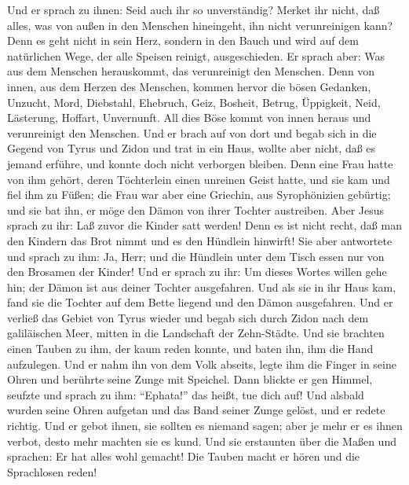  Und er sprach zu ihnen: Seid auch ihr so unverständig?
Merket ihr nicht, daß alles, was von außen in den Menschen hineingeht,
ihn nicht verunreinigen kann?  Denn es geht nicht in sein
Herz, sondern in den Bauch und wird auf dem natürlichen Wege, der alle
Speisen reinigt, ausgeschieden.  Er sprach aber: Was aus
dem Menschen herauskommt, das verunreinigt den Menschen. 
Denn von innen, aus dem Herzen des Menschen, kommen hervor die bösen
Gedanken, Unzucht, Mord, Diebstahl,  Ehebruch, Geiz,
Bosheit, Betrug, Üppigkeit, Neid, Lästerung, Hoffart, Unvernunft.
 All dies Böse kommt von innen heraus und verunreinigt
den Menschen.  Und er brach auf von dort und begab sich
in die Gegend von Tyrus und Zidon und trat in ein Haus, wollte aber
nicht, daß es jemand erführe, und konnte doch nicht verborgen bleiben.
 Denn eine Frau hatte von ihm gehört, deren Töchterlein
einen unreinen Geist hatte, und sie kam und fiel ihm zu Füßen;
 die Frau war aber eine Griechin, aus Syrophönizien
gebürtig; und sie bat ihn, er möge den Dämon von ihrer Tochter
austreiben.  Aber Jesus sprach zu ihr: Laß zuvor die
Kinder satt werden! Denn es ist nicht recht, daß man den Kindern das
Brot nimmt und es den Hündlein hinwirft!  Sie aber
antwortete und sprach zu ihm: Ja, Herr; und die Hündlein unter dem Tisch
essen nur von den Brosamen der Kinder!  Und er sprach zu
ihr: Um dieses Wortes willen gehe hin; der Dämon ist aus deiner Tochter
ausgefahren.  Und als sie in ihr Haus kam, fand sie die
Tochter auf dem Bette liegend und den Dämon ausgefahren. 
Und er verließ das Gebiet von Tyrus wieder und begab sich durch Zidon
nach dem galiläischen Meer, mitten in die Landschaft der Zehn-Städte.
 Und sie brachten einen Tauben zu ihm, der kaum reden
konnte, und baten ihn, ihm die Hand aufzulegen.  Und er
nahm ihn von dem Volk abseits, legte ihm die Finger in seine Ohren und
berührte seine Zunge mit Speichel.  Dann blickte er gen
Himmel, seufzte und sprach zu ihm: ``Ephata!'' das heißt, tue dich auf!
 Und alsbald wurden seine Ohren aufgetan und das Band
seiner Zunge gelöst, und er redete richtig.  Und er gebot
ihnen, sie sollten es niemand sagen; aber je mehr er es ihnen verbot,
desto mehr machten sie es kund.  Und sie erstaunten über
die Maßen und sprachen: Er hat alles wohl gemacht! Die Tauben macht er
hören und die Sprachlosen reden!

